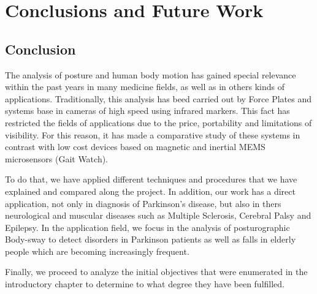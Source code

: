 \chapter{Conclusions and Future Work}
\label{ch:Conclusions}
\section{Conclusion}
The analysis of posture and human body motion  has gained special relevance within the past years in many medicine fields, as well as in others kinds of applications. Traditionally, this analysis has beed carried out by Force Plates and systems base in cameras of high speed using infrared markers. This fact has restricted the fields of applications due to the price, portability and limitations of visibility. For this reason, it has made a comparative study of these systems in contrast with low cost devices based on magnetic and inertial MEMS microsensors (Gait Watch).

To do that, we have applied different techniques and procedures that we have explained and compared along the project.
In addition, our work has a direct application, not only in diagnosis of Parkinson’s disease, but also in thers neurological and muscular diseases such as Multiple Sclerosis, Cerebral Palsy and Epilepsy. In the application field, we focus in the analysis of posturographic  Body-sway to detect disorders in Parkinson patients as well as falls in elderly people which are becoming increasingly frequent.

Finally, we proceed to analyze the initial objectives that were enumerated in the introductory chapter to determine to what degree they have been fulfilled.


